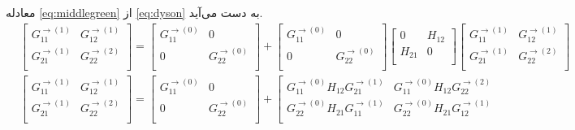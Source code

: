 معادله \ref{eq:middlegreen} از \ref{eq:dyson} به دست می‌آید.
\begin{equation}
‌   \begin{split}
          & \left[ \begin{matrix}
           G_{11}^{\to (1)} & G_{12}^{\to (1)}  \\
           G_{21}^{\to (1)} & G_{22}^{\to (2)}  \\
        \end{matrix} \right]=\left[ \begin{matrix}
           G_{11}^{\to (0)} & 0  \\
           0 & G_{22}^{\to (0)}  \\
        \end{matrix} \right]+\left[ \begin{matrix}
           G_{11}^{\to (0)} & 0  \\
           0 & G_{22}^{\to (0)}  \\
        \end{matrix} \right]\left[ \begin{matrix}
           0 & {{H}_{12}}  \\
           {{H}_{21}} & 0  \\
        \end{matrix} \right]\left[ \begin{matrix}
           G_{11}^{\to (1)} & G_{12}^{\to (1)}  \\
           G_{21}^{\to (1)} & G_{22}^{\to (2)}  \\
        \end{matrix} \right] \\ 
         & \left[ \begin{matrix}
           G_{11}^{\to (1)} & G_{12}^{\to (1)}  \\
           G_{21}^{\to (1)} & G_{22}^{\to (2)}  \\
        \end{matrix} \right]=\left[ \begin{matrix}
           G_{11}^{\to (0)} & 0  \\
           0 & G_{22}^{\to (0)}  \\
        \end{matrix} \right]+\left[ \begin{matrix}
           G_{11}^{\to (0)}{{H}_{12}}G_{21}^{\to (1)} & G_{11}^{\to (0)}{{H}_{12}}G_{22}^{\to (2)}  \\
           G_{22}^{\to (0)}{{H}_{21}}G_{11}^{\to (1)} & G_{22}^{\to (0)}{{H}_{21}}G_{12}^{\to (1)}  \\

\end{matrix}
\end{split}
\end{equation}
